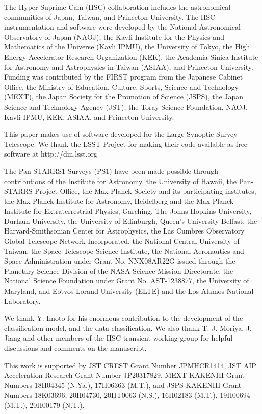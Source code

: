 \documentclass[useamsfonts]{pasj01}
\begin{document}
\begin{ack}
The Hyper Suprime-Cam (HSC) collaboration includes the astronomical communities of Japan, Taiwan, and Princeton University. The HSC instrumentation and software were developed by the National Astronomical Observatory of Japan (NAOJ), the Kavli Institute for the Physics and Mathematics of the Universe (Kavli IPMU), the University of Tokyo, the High Energy Accelerator Research Organization (KEK), the Academia Sinica Institute for Astronomy and Astrophysics in Taiwan (ASIAA), and Princeton University. Funding was contributed by the FIRST program from the Japanese Cabinet Office, the Ministry of Education, Culture, Sports, Science and Technology (MEXT), the Japan Society for the Promotion of Science (JSPS), the Japan Science and Technology Agency (JST), the Toray Science Foundation, NAOJ, Kavli IPMU, KEK, ASIAA, and Princeton University.

This paper makes use of software developed for the Large Synoptic Survey Telescope. We thank the LSST Project for making their code available as free software at  http://dm.lsst.org

The Pan-STARRS1 Surveys (PS1) have been made possible through contributions of the Institute for Astronomy, the University of Hawaii, the Pan-STARRS Project Office, the Max-Planck Society and its participating institutes, the Max Planck Institute for Astronomy, Heidelberg and the Max Planck Institute for Extraterrestrial Physics, Garching, The Johns Hopkins University, Durham University, the University of Edinburgh, Queen’s University Belfast, the Harvard-Smithsonian Center for Astrophysics, the Las Cumbres Observatory Global Telescope Network Incorporated, the National Central University of Taiwan, the Space Telescope Science Institute, the National Aeronautics and Space Administration under Grant No. NNX08AR22G issued through the Planetary Science Division of the NASA Science Mission Directorate, the National Science Foundation under Grant No. AST-1238877, the University of Maryland, and Eotvos Lorand University (ELTE) and the Los Alamos National Laboratory.

We thank Y. Imoto for his enormous contribution to the development of the classification model, and the data classification.
We also thank T. J. Moriya, J. Jiang and other members of the HSC transient working group for helpful discussions and comments on the manuscript.

This work is supported by JST CREST Grant Number JPMHCR1414, JST AIP Acceleration Research Grant Number JP20317829, MEXT KAKENHI Grant Numbers 18H04345 (N.Ya.), 17H06363 (M.T.), and JSPS KAKENHI Grant Numbers 18K03696, 20H04730, 20HT0063 (N.S.), 16H02183 (M.T.), 19H00694 (M.T.), 20H00179 (N.T.).


\end{ack}
\end{document}
